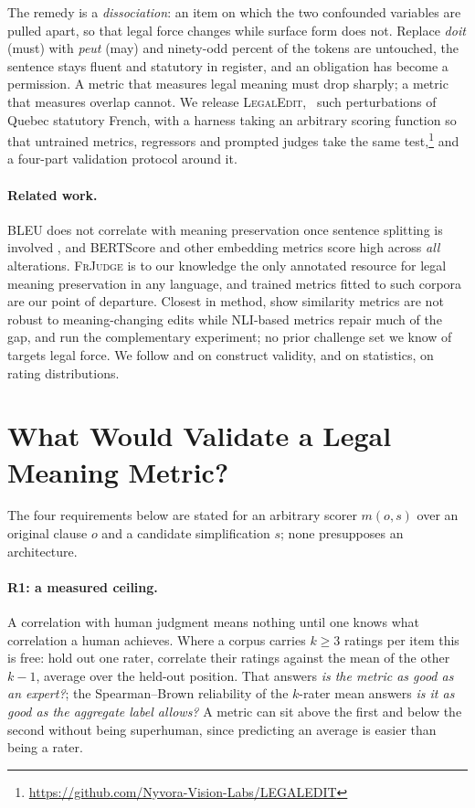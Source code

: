 \documentclass[11pt]{article}
\begin{document}
The remedy is a \emph{dissociation}: an item on which the two confounded
variables are pulled apart, so that legal force changes while surface form does
not. Replace \emph{doit} (must) with \emph{peut} (may) and ninety-odd percent of
the tokens are untouched, the sentence stays fluent and statutory in register,
and an obligation has become a permission. A metric that measures legal meaning
must drop sharply; a metric that measures overlap cannot. We release
\textsc{LegalEdit}, \numedits\ such perturbations of Quebec statutory French,
with a harness taking an arbitrary scoring function so that untrained metrics,
regressors and prompted judges take the same
test,\footnote{\url{https://github.com/Nyvora-Vision-Labs/LEGALEDIT}} and a
four-part validation protocol around it.

\paragraph{Related work.}
BLEU does not correlate with meaning preservation once sentence splitting is
involved \citep{sulem2018bleu}, and BERTScore \citep{zhang2019bertscore} and
other embedding metrics score high across \emph{all} alterations.
\textsc{FrJudge} \citep{beauchemin2025judgebert} is to our knowledge the only
annotated resource for legal meaning preservation in any language, and trained
metrics fitted to such corpora \citep{beauchemin2023meaningbert} are our point
of departure. Closest in method, \citet{chen2023menli} show similarity metrics
are not robust to meaning-changing edits while NLI-based metrics repair much of
the gap, and \citet{mujahid2026stress} run the complementary experiment; no
prior challenge set we know of targets legal force. We follow
\citet{bean2025construct} and \citet{pacchiardi2024cleverhans} on construct
validity, \citet{deutsch2021statistical} and \citet{graham2014williams} on
statistics, \citet{xu2026disagreement} on rating distributions.

\section{What Would Validate a Legal Meaning Metric?}
\label{sec:protocol}

The four requirements below are stated for an arbitrary scorer $m(o,s)$ over an
original clause $o$ and a candidate simplification $s$; none presupposes an
architecture.

\paragraph{R1: a measured ceiling.}
A correlation with human judgment means nothing until one knows what correlation
a human achieves. Where a corpus carries $k \geq 3$ ratings per item this is
free: hold out one rater, correlate their ratings against the mean of the other
$k-1$, average over the held-out position. That answers \emph{is the metric as
good as an expert?}; the Spearman--Brown reliability of the $k$-rater mean
answers \emph{is it as good as the aggregate label allows?} A metric can sit
above the first and below the second without being superhuman, since predicting
an average is easier than being a rater.
\end{document}
